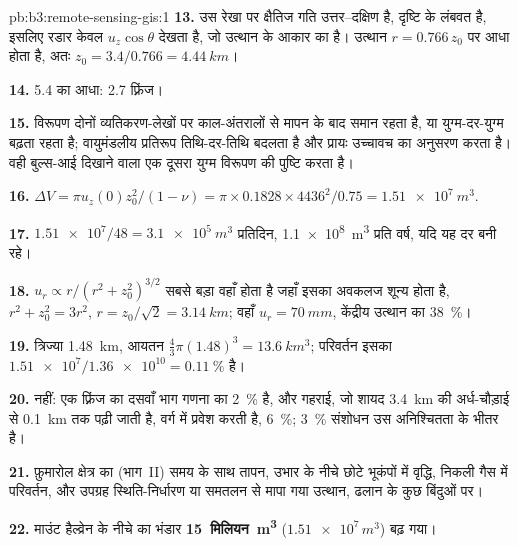 \begin{solution}{pb:b3:remote-sensing-gis:1}
\textbf{13.} उस रेखा पर क्षैतिज गति उत्तर--दक्षिण है,
दृष्टि के लंबवत है, इसलिए रडार केवल $u_z\cos\theta$ देखता है,
जो उत्थान के आकार का है। उत्थान $r = 0.766\,z_0$ पर आधा होता है, अतः $z_0 =
3.4/0.766 = \qty{4.44}{km}$।

\textbf{14.} 5.4 का आधा: 2.7 फ़्रिंज।

\textbf{15.} विरूपण दोनों व्यतिकरण-लेखों पर काल-अंतरालों से मापन के बाद
समान रहता है, या युग्म-दर-युग्म बढ़ता रहता है; वायुमंडलीय
प्रतिरूप तिथि-दर-तिथि बदलता है और प्रायः
उच्चावच का अनुसरण करता है। वही बुल्स-आई दिखाने वाला एक दूसरा युग्म
विरूपण की पुष्टि करता है।

\textbf{16.} $\Delta V = \pi u_z(0)z_0^2/(1 - \nu) = \pi\times0.1828\times
4436^2/0.75 = \qty{1.51e7}{m^3}$.

\textbf{17.} $\num{1.51e7}/48 = \qty{3.1e5}{m^3}$ प्रतिदिन,
\qty{1.1e8}{m^3} प्रति वर्ष, यदि यह दर बनी रहे।

\textbf{18.} $u_r \propto r/(r^2 + z_0^2)^{3/2}$ सबसे बड़ा वहाँ होता है जहाँ इसका
अवकलज शून्य होता है, $r^2 + z_0^2 = 3r^2$, $r = z_0/\sqrt2 = \qty{3.14}{km}$;
वहाँ $u_r = \qty{70}{mm}$, केंद्रीय उत्थान का \qty{38}{\percent}।

\textbf{19.} त्रिज्या \qty{1.48}{km}, आयतन $\frac43\pi(1.48)^3 =
\qty{13.6}{km^3}$; परिवर्तन इसका $\num{1.51e7}/\num{1.36e10} =
\qty{0.11}{\percent}$ है।

\textbf{20.} नहीं: एक फ़्रिंज का दसवाँ भाग गणना का \qty{2}{\percent} है, और
गहराई, जो शायद \qty{3.4}{km} की अर्ध-चौड़ाई से
\qty{0.1}{km} तक पढ़ी जाती है, वर्ग में प्रवेश करती है, \qty{6}{\percent}; \qty{3}{\percent}
संशोधन उस अनिश्चितता के भीतर है।

\textbf{21.} फ़ुमारोल क्षेत्र का (भाग~II) समय के साथ तापन,
उभार के नीचे छोटे भूकंपों में वृद्धि, निकली गैस में परिवर्तन,
और उपग्रह स्थिति-निर्धारण या समतलन से मापा गया उत्थान,
ढलान के कुछ बिंदुओं पर।

\textbf{22.} माउंट हैल्व्रेन के नीचे का भंडार
\textbf{15~मिलियन~\unit[text-series-to-math=true]{m^3}} ($\num{1.51e7}\,\unit{m^3}$) बढ़ गया।
\end{solution}
